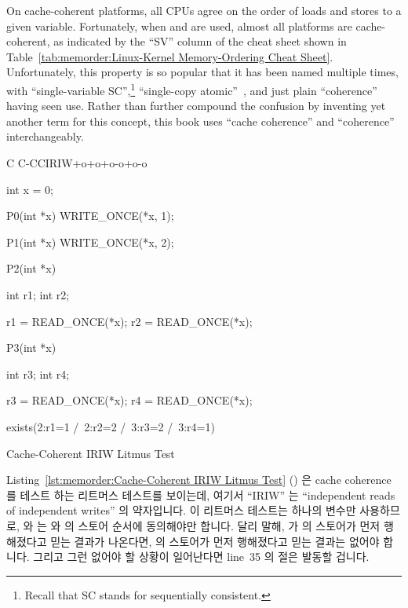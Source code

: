 On cache-coherent platforms, all CPUs agree on the order of loads and
stores to a given variable.
Fortunately, when  and  are used,
almost all platforms are cache-coherent, as indicated by the ``SV''
column of the cheat sheet shown in
Table~\ref{tab:memorder:Linux-Kernel Memory-Ordering Cheat Sheet}.
Unfortunately, this property is so popular that it has been named
multiple times, with ``single-variable SC'',\footnote{
	Recall that SC stands for sequentially consistent.}
``single-copy atomic''~\cite{Stone:1995:SP:623262.623912},
and just plain ``coherence''~\cite{JadeAlglave2011ppcmem}
having seen use.
Rather than further compound the confusion by inventing yet another term
for this concept, this book uses ``cache coherence'' and ``coherence''
interchangeably.
\fi

\begin{listing}[tbp]
{ \scriptsize
\begin{verbbox}[\LstLineNo]
C C-CCIRIW+o+o+o-o+o-o

{
int x = 0;
}

P0(int *x)
{
  WRITE_ONCE(*x, 1);
}

P1(int *x)
{
  WRITE_ONCE(*x, 2);
}

P2(int *x)
{
  int r1;
  int r2;

  r1 = READ_ONCE(*x);
  r2 = READ_ONCE(*x);
}

P3(int *x)
{
  int r3;
  int r4;

  r3 = READ_ONCE(*x);
  r4 = READ_ONCE(*x);
}

exists(2:r1=1 /\ 2:r2=2 /\ 3:r3=2 /\ 3:r4=1)
\end{verbbox}
}
\centering
\theverbbox
\caption{Cache-Coherent IRIW Litmus Test}
\label{lst:memorder:Cache-Coherent IRIW Litmus Test}
\end{listing}

Listing~\ref{lst:memorder:Cache-Coherent IRIW Litmus Test}
()
은 cache coherence 를 테스트 하는 리트머스 테스트를 보이는데, 여기서 ``IRIW''
는 ``independent reads of independent writes'' 의 약자입니다.
이 리트머스 테스트는 하나의 변수만 사용하므로,  와  는
 와  의 스토어 순서에 동의해야만 합니다.
달리 말해,  가  의 스토어가 먼저 행해졌다고 믿는 결과가
나온다면,   의 스토어가 먼저 행해졌다고 믿는 결과는 없어야
합니다.
그리고 그런 없어야 할 상황이 일어난다면 line~35 의  절은 발동할
겁니다.


